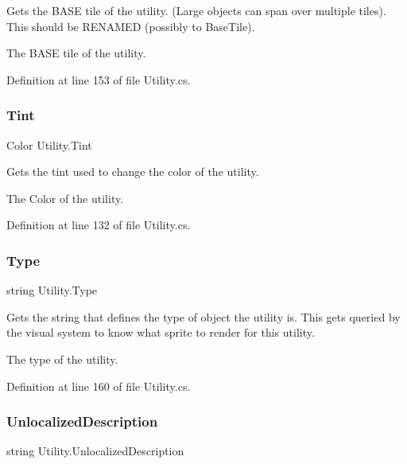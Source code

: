 Gets the B\+A\+SE tile of the utility. (Large objects can span over multiple tiles). This should be R\+E\+N\+A\+M\+ED (possibly to Base\+Tile). 

The B\+A\+SE tile of the utility.

Definition at line 153 of file Utility.\+cs.

\mbox{\label{class_utility_ab87189fd3ca0e6d448cabfe254ded0cb}} 
\subsubsection{\texorpdfstring{Tint}{Tint}}
{\footnotesize\ttfamily Color Utility.\+Tint\hspace{0.3cm}{\ttfamily [get]}}



Gets the tint used to change the color of the utility. 

The Color of the utility.

Definition at line 132 of file Utility.\+cs.

\mbox{\label{class_utility_a482c0a04d918813023914288701526f6}} 
\subsubsection{\texorpdfstring{Type}{Type}}
{\footnotesize\ttfamily string Utility.\+Type\hspace{0.3cm}{\ttfamily [get]}}



Gets the string that defines the type of object the utility is. This gets queried by the visual system to know what sprite to render for this utility. 

The type of the utility.

Definition at line 160 of file Utility.\+cs.

\mbox{\label{class_utility_a35e4fbf70d953b969e2637bba1256254}} 
\subsubsection{\texorpdfstring{Unlocalized\+Description}{UnlocalizedDescription}}
{\footnotesize\ttfamily string Utility.\+Unlocalized\+Description\hspace{0.3cm}{\ttfamily [get]}}



